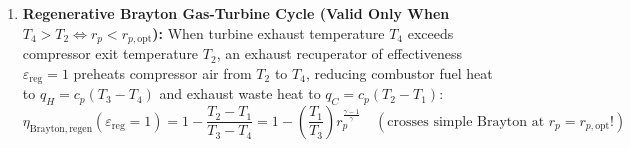 \begin{formulacard}
\begin{enumerate}
\begin{equation}
  \end{equation}
  \item \textbf{Regenerative Brayton Gas-Turbine Cycle (Valid Only When $T_4 > T_2 \iff r_p < r_{p,\mathrm{opt}}$):}
  When turbine exhaust temperature $T_4$ exceeds compressor exit temperature $T_2$, an exhaust recuperator of effectiveness $\varepsilon_{\mathrm{reg}}=1$ preheats compressor air from $T_2$ to $T_4$, reducing combustor fuel heat to $q_H = c_p(T_3 - T_4)$ and exhaust waste heat to $q_C = c_p(T_2 - T_1)$:
  \begin{equation}\label{eq:09:brayton-regen}
    \boxed{\eta_{\mathrm{Brayton,regen}}(\varepsilon_{\mathrm{reg}}=1) = 1 - \frac{T_2 - T_1}{T_3 - T_4} = 1 - \left(\frac{T_1}{T_3}\right)r_p^{\frac{\gamma - 1}{\gamma}}} \quad (\text{crosses simple Brayton at } r_p = r_{p,\mathrm{opt}}!)
  \end{equation}
\end{enumerate}
\end{formulacard}

